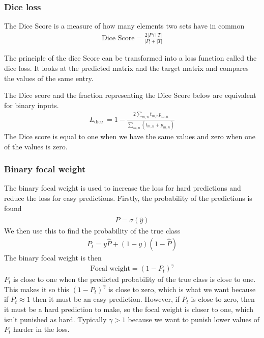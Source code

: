 \documentclass[a4paper,12pt]{article}
\begin{document}
\subsubsection{Dice loss}
The Dice Score is a measure of how many elements two sets have in common
\begin{align}
\text{Dice Score} =\frac{2|P \cap T|}{|P|+|T|}
\end{align}




The principle of the dice Score can be transformed into a loss function called the dice loss. It looks at the predicted matrix and the target matrix and compares the values of the same entry.


The Dice score and the fraction representing the Dice Score below are equivalent for binary inputs.
\begin{align}
L_{\text {dice }}=1-\frac{2 \sum_{m,n} t_{m,n} p_{m,n}}{\sum_{m,n}\left(t_{m,n}+p_{m,n}\right)}
\end{align}
The Dice score is equal to one when we have the same values and zero when one of the values is zero.
\subsubsection{Binary focal weight}
The binary focal weight is used to increase the loss for hard predictions and reduce the loss for easy predictions. Firstly, the probability of the predictions is found
\begin{align}
\hat{P} = \sigma(\hat{y})
\end{align}
We then use this to find the probability of the true class
\begin{align}
P_t = y \hat{P} + (1-y)(1-\hat{P})
\end{align}
The binary focal weight is then
\begin{align}
\text{Focal weight} = (1-P_t)^\gamma
\end{align}
$P_t$ is close to one when the predicted probability of the true class is close to one. This makes it so this $(1-P_t)^\gamma$ is close to zero, which is what we want because if $P_t \approx 1$ then it must be an easy prediction. However, if $P_t$ is close to zero, then it must be a hard prediction to make, so the focal weight is closer to one, which isn't punished as hard. Typically $\gamma > 1$ because we want to punish lower values of $P_t$ harder in the loss.
\end{document}
